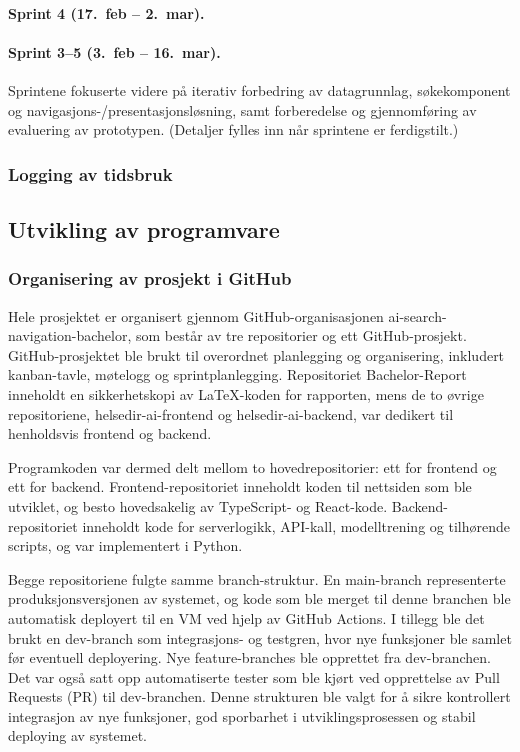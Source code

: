 \paragraph{Sprint 4 (17.\ feb -- 2.\ mar).}

\paragraph{Sprint 3--5 (3.\ feb -- 16.\ mar).}
Sprintene fokuserte videre på iterativ forbedring av datagrunnlag, søkekomponent og navigasjons-/presentasjonsløsning, samt forberedelse og gjennomføring av evaluering av prototypen. (Detaljer fylles inn når sprintene er ferdigstilt.)

\subsubsection{Logging av tidsbruk}


\subsection{Utvikling av programvare}

\subsubsection{Organisering av prosjekt i GitHub}
Hele prosjektet er organisert gjennom GitHub-organisasjonen ai-search-navigation-bachelor, som består av tre repositorier og ett GitHub-prosjekt. GitHub-prosjektet ble brukt til overordnet planlegging og organisering, inkludert kanban-tavle, møtelogg og sprintplanlegging. Repositoriet Bachelor-Report inneholdt en sikkerhetskopi av LaTeX-koden for rapporten, mens de to øvrige repositoriene, helsedir-ai-frontend og helsedir-ai-backend, var dedikert til henholdsvis frontend og backend.

Programkoden var dermed delt mellom to hovedrepositorier: ett for frontend og ett for backend. Frontend-repositoriet inneholdt koden til nettsiden som ble utviklet, og besto hovedsakelig av TypeScript- og React-kode. Backend-repositoriet inneholdt kode for serverlogikk, API-kall, modelltrening og tilhørende scripts, og var implementert i Python.

Begge repositoriene fulgte samme branch-struktur. En main-branch representerte produksjonsversjonen av systemet, og kode som ble merget til denne branchen ble automatisk deployert til en VM ved hjelp av GitHub Actions. I tillegg ble det brukt en dev-branch som integrasjons- og testgren, hvor nye funksjoner ble samlet før eventuell deployering. Nye feature-branches ble opprettet fra dev-branchen. Det var også satt opp automatiserte tester som ble kjørt ved opprettelse av Pull Requests (PR) til dev-branchen. Denne strukturen ble valgt for å sikre kontrollert integrasjon av nye funksjoner, god sporbarhet i utviklingsprosessen og stabil deploying av systemet.


